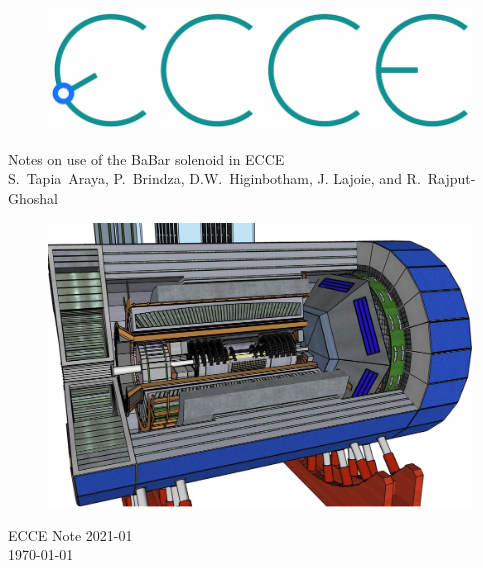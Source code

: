 \renewcommand*\familydefault{\sfdefault}
{\sffamily
\vfill
\vspace{4cm}
\begin{figure}[H]
  \begin{center}
  \includegraphics[width=0.3\linewidth]{figs/ecce-logo.png}
\end{center}
\end{figure}

\vspace{2mm}

\begin{center}
  \large
{\LARGE{Notes on use of the BaBar solenoid in ECCE}} \\
\vspace{0.25cm}
S.~Tapia~Araya, P.~Brindza, D.W.~Higinbotham, J. Lajoie, and R.~Rajput-Ghoshal \\
\end{center}


\vfill
\begin{figure}[H]
  \begin{center}
    \includegraphics[width=0.7\linewidth]{figs/ECCE.png}
  \end{center}
\end{figure}
}
\vspace{2.5cm}

\begin{center}
{\LARGE{ECCE Note 2021-01}} \\
\vspace{2mm}
{\large{\today}}
\end{center}
\renewcommand*\familydefault{\rmdefault}
